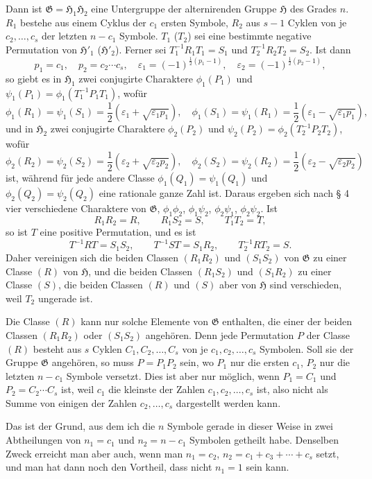 \documentclass[11pt]{article}
\newcommand{\Hgr}{\mathfrak{H}}
\newcommand{\Ggr}{\mathfrak{G}}
\newcommand{\eps}{\varepsilon}
\begin{document}
Dann ist $\Ggr=\Hgr_1\Hgr_2$ eine Untergruppe der alternirenden Gruppe $\Hgr$ des Grades $n$. $R_1$ bestehe aus einem Cyklus der $c_1$ ersten Symbole, $R_2$ aus $s-1$ Cyklen von je $c_2,\ldots,c_s$ der letzten $n-c_1$ Symbole. $T_1$ ($T_2$) sei eine bestimmte negative Permutation von $\Hgr'_1$ ($\Hgr'_2$). Ferner sei $T_1^{-1}R_1T_1=S_1$ und $T_2^{-1}R_2T_2=S_2$. Ist dann
\[
 p_1=c_1,	\quad p_2=c_2\cdots c_s,	\quad \eps_1=(-1)^{\frac12(p_1-1)},	\quad \eps_2=(-1)^{\frac12(p_2-1)},
\]
so giebt es in $\Hgr_1$ zwei conjugirte Charaktere $\phi_1(P_1)$ und $\psi_1(P_1)=\phi_1(T_1^{-1}P_1T_1)$, wofür
\[
 \phi_1(R_1)=\psi_1(S_1)=\frac12(\eps_1+\sqrt{\eps_1p_1}),	\quad
 \phi_1(S_1)=\psi_1(R_1)=\frac12(\eps_1-\sqrt{\eps_1p_1}),
\]
und in $\Hgr_2$ zwei conjugirte Charaktere $\phi_2(P_2)$ und $\psi_2(P_2)=\phi_2(T_2^{-1}P_2T_2)$, wofür
\[
 \phi_2(R_2)=\psi_2(S_2)=\frac12(\eps_2+\sqrt{\eps_2p_2}),	\quad
 \phi_2(S_2)=\psi_2(R_2)=\frac12(\eps_2-\sqrt{\eps_2p_2})
\]
ist, während für jede andere Classe $\phi_1(Q_1)=\psi_1(Q_1)$ und $\phi_2(Q_2)=\psi_2(Q_2)$ eine rationale ganze Zahl ist. Daraus ergeben sich nach § 4 vier verschiedene Charaktere von $\Ggr$, $\phi_1\phi_2$, $\phi_1\psi_2$, $\phi_2\psi_1$, $\phi_2\psi_2$. Ist
\[
 R_1R_2=R,	\qquad R_1S_2=S,	\qquad T_1T_2=T,
\]
so ist $T$ eine positive Permutation, und es ist
\[
 T^{-1}RT=S_1S_2,	\qquad T^{-1}ST=S_1R_2,	\qquad T_2^{-1}RT_2=S.
\]
Daher vereinigen sich die beiden Classen $(R_1R_2)$ und $(S_1S_2)$ von $\Ggr$ zu einer Classe $(R)$ von $\Hgr$, und die beiden Classen $(R_1S_2)$ und $(S_1R_2)$ zu einer Classe $(S)$, die beiden Classen $(R)$ und $(S)$ aber von $\Hgr$ sind verschieden, weil $T_2$ ungerade ist.

Die Classe $(R)$ kann nur solche Elemente von $\Ggr$ enthalten, die einer der beiden Classen $(R_1R_2)$ oder $(S_1S_2)$ angehören. Denn jede Permutation $P$ der Classe $(R)$ besteht aus $s$ Cyklen $C_1,C_2,\ldots,C_s$ von je $c_1,c_2,\ldots,c_s$ Symbolen. Soll sie der Gruppe $\Ggr$ angehören, so muss $P=P_1P_2$ sein, wo $P_1$ nur die ersten $c_1$, $P_2$ nur die letzten $n-c_1$ Symbole versetzt. Dies ist aber nur möglich, wenn $P_1=C_1$ und $P_2=C_2\cdots C_s$ ist, weil $c_1$ die kleinste der Zahlen $c_1,c_2,\ldots,c_s$ ist, also nicht als Summe von einigen der Zahlen $c_2,\ldots,c_s$ dargestellt werden kann.

Das ist der Grund, aus dem ich die $n$ Symbole gerade in dieser Weise in zwei Abtheilungen von $n_1=c_1$ und $n_2=n-c_1$ Symbolen getheilt habe. Denselben Zweck erreicht man aber auch, wenn man $n_1=c_2$, $n_2=c_1+c_3+\cdots+c_s$ setzt, und man hat dann noch den Vortheil, dass nicht $n_1=1$ sein kann.
\end{document}
